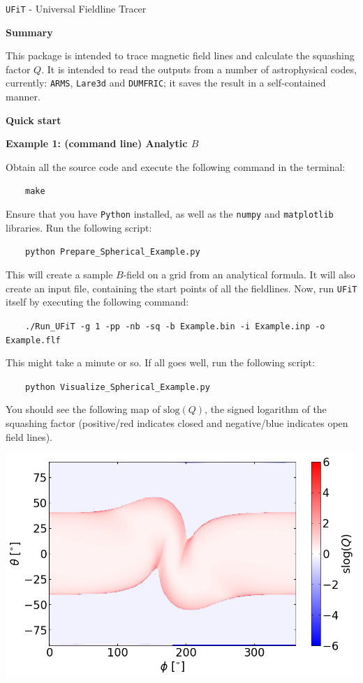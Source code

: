 \documentclass[12pt,twoside]{article}
\begin{document}
\begin{center}
{\LARGE \texttt{UFiT} - Universal Fieldline Tracer}
\end{center}

{\Large \textbf{Summary}}

\vspace{1mm}

This package is intended to trace magnetic field lines and calculate the squashing factor $Q$. It is intended to read the outputs from a number of astrophysical codes, currently: \texttt{ARMS}, \texttt{Lare3d} and \texttt{DUMFRIC}; it saves the result in a self-contained manner.



\vspace{2mm}
{\Large \textbf{Quick start}}

\vspace{2mm}
{\large \textbf{Example 1: (command line) Analytic $B$}}

Obtain all the source code and execute the following command in the terminal:

$\quad\quad$\texttt{make}

Ensure that you have \texttt{Python} installed, as well as the \texttt{numpy} and \texttt{matplotlib} libraries. Run the following script:

$\quad\quad$\texttt{python Prepare\_Spherical\_Example.py}

This will create a sample $B$-field on a grid from an analytical formula. It will also create an input file, containing the start points of all the fieldlines. Now, run \texttt{UFiT} itself by executing the following command:

$\quad\quad$\texttt{./Run\_UFiT -g 1 -pp -nb -sq -b Example.bin -i Example.inp -o Example.flf}

This might take a minute or so. If all goes well, run the following script:

$\quad\quad$\texttt{python Visualize\_Spherical\_Example.py}

You should see the following map of $\mathrm{slog}(Q)$, the signed logarithm of the squashing factor (positive/red indicates closed and negative/blue indicates open field lines).

\begin{center}
\includegraphics[scale=0.6]{Spherical_Example.png}
\end{center}
\end{document}
